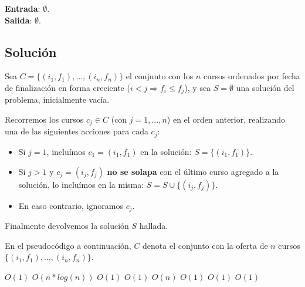 \documentclass[a4paper, 10pt, twoside]{article}
\newenvironment{pseudo}[1][]{%
    \vspace{0.5em}%
    \begin{algorithmic}%
}
{%
    \end{algorithmic}%
    \vspace{0.5em}%
}
\newcommand{\To}{\textbf{to} }
\newcommand{\Ode}[1]{\hfill $O(#1)$}
\begin{document}
\textbf{Entrada}: $\emptyset$.\\
\textbf{Salida}: $\emptyset$.


\subsection{Solución}

Sea $C = \{ (i_1, f_1), \ldots, (i_n, f_n) \}$ el conjunto con los $n$ cursos ordenados por fecha de finalización en forma creciente ($i < j \Rightarrow f_i \leq f_j$), y sea $S = \emptyset$ una solución del problema, inicialmente vacía.

Recorremos los cursos $c_j \in C$ (con $j = 1, \ldots, n$) en el orden anterior, realizando una de las siguientes acciones para cada $c_j$:

\begin{itemize}
    \item{
        Si $j = 1$, incluímos $c_1 = (i_1, f_1)$ en la solución: $S = \{ (i_1, f_1) \}$.
    }
    \item{
        Si $j > 1$ y $c_j = (i_j, f_j)$ \textbf{no se solapa} con el último curso agregado a la solución, lo incluímos en la misma: $S = S \cup \{ (i_j, f_j) \}$.
    }
    \item{
        En caso contrario, ignoramos $c_j$.
    }
\end{itemize}

Finalmente devolvemos la solución $S$ hallada.

En el pseudocódigo a continuación, $C$ denota el conjunto con la oferta de $n$ cursos $\{ (i_1, f_1), \ldots, (i_n, f_n) \}$.

\begin{pseudo}
                                            \Ode{1}
        \Else
                                     \Ode{n * log(n)}
                                    \Ode{1}
                                                 \Ode{1}
            \For{$j = 2$ \To $|C|$}                             \Ode{n}
                                                \Ode{1}
                           \Ode{1}
                                                 \Ode{1}
                \EndIf
            \EndFor
        \EndIf
    \EndProcedure 
\end{pseudo}
\end{document}
